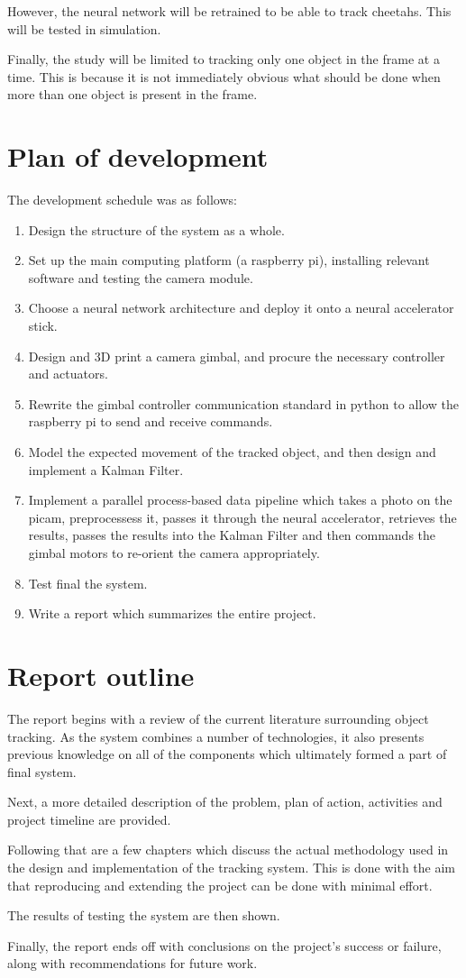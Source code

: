 However, the neural network will be retrained to be able to track cheetahs. This will be tested in simulation.

Finally, the study will be limited to tracking only one object in the frame at a time. This is because it is not immediately obvious what should be done when more than one object is present in the frame.


\section{Plan of development}
The development schedule was as follows:

\begin{enumerate}
\item Design the structure of the system as a whole.
\item Set up the main computing platform (a raspberry pi), installing relevant software and testing the camera module.
\item Choose a neural network architecture and deploy it onto a neural accelerator stick.
\item Design and 3D print a camera gimbal, and procure the necessary controller and actuators.
\item Rewrite the gimbal controller communication standard in python to allow the raspberry pi to send and receive commands.
\item Model the expected movement of the tracked object, and then design and implement a Kalman Filter.
\item Implement a parallel process-based data pipeline which takes a photo on the picam, preprocessess it, passes it through the neural accelerator, retrieves the results, passes the results into the Kalman Filter and then commands the gimbal motors to re-orient the camera appropriately.
\item Test final the system.
\item Write a report which summarizes the entire project.
\end{enumerate}

\section{Report outline}

The report begins with a review of the current literature surrounding object tracking. As the system combines a number of technologies, it also presents previous knowledge on all of the components which ultimately formed a part of final system.

Next, a more detailed description of the problem, plan of action, activities and project timeline are provided.

Following that are a few chapters which discuss the actual methodology used in the design and implementation of the tracking system. This is done with the aim that reproducing and extending the project can be done with minimal effort.

The results of testing the system are then shown.

Finally, the report ends off with conclusions on the project's success or failure, along with recommendations for future work.
